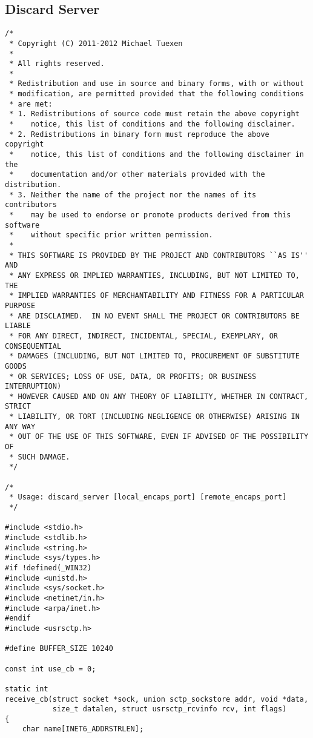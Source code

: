 \documentclass[a4paper]{article}
\begin{document}
\subsection{Discard Server}\label{server}
\begin{verbatim}
/*
 * Copyright (C) 2011-2012 Michael Tuexen
 *
 * All rights reserved.
 *
 * Redistribution and use in source and binary forms, with or without
 * modification, are permitted provided that the following conditions
 * are met:
 * 1. Redistributions of source code must retain the above copyright
 *    notice, this list of conditions and the following disclaimer.
 * 2. Redistributions in binary form must reproduce the above copyright
 *    notice, this list of conditions and the following disclaimer in the
 *    documentation and/or other materials provided with the distribution.
 * 3. Neither the name of the project nor the names of its contributors
 *    may be used to endorse or promote products derived from this software
 *    without specific prior written permission.
 *
 * THIS SOFTWARE IS PROVIDED BY THE PROJECT AND CONTRIBUTORS ``AS IS'' AND
 * ANY EXPRESS OR IMPLIED WARRANTIES, INCLUDING, BUT NOT LIMITED TO, THE
 * IMPLIED WARRANTIES OF MERCHANTABILITY AND FITNESS FOR A PARTICULAR PURPOSE
 * ARE DISCLAIMED.	IN NO EVENT SHALL THE PROJECT OR CONTRIBUTORS BE LIABLE
 * FOR ANY DIRECT, INDIRECT, INCIDENTAL, SPECIAL, EXEMPLARY, OR CONSEQUENTIAL
 * DAMAGES (INCLUDING, BUT NOT LIMITED TO, PROCUREMENT OF SUBSTITUTE GOODS
 * OR SERVICES; LOSS OF USE, DATA, OR PROFITS; OR BUSINESS INTERRUPTION)
 * HOWEVER CAUSED AND ON ANY THEORY OF LIABILITY, WHETHER IN CONTRACT, STRICT
 * LIABILITY, OR TORT (INCLUDING NEGLIGENCE OR OTHERWISE) ARISING IN ANY WAY
 * OUT OF THE USE OF THIS SOFTWARE, EVEN IF ADVISED OF THE POSSIBILITY OF
 * SUCH DAMAGE.
 */

/*
 * Usage: discard_server [local_encaps_port] [remote_encaps_port]
 */

#include <stdio.h>
#include <stdlib.h>
#include <string.h>
#include <sys/types.h>
#if !defined(_WIN32)
#include <unistd.h>
#include <sys/socket.h>
#include <netinet/in.h>
#include <arpa/inet.h>
#endif
#include <usrsctp.h>

#define BUFFER_SIZE 10240

const int use_cb = 0;

static int
receive_cb(struct socket *sock, union sctp_sockstore addr, void *data,
           size_t datalen, struct usrsctp_rcvinfo rcv, int flags)
{
    char name[INET6_ADDRSTRLEN];


\end{verbatim}
\end{document}
